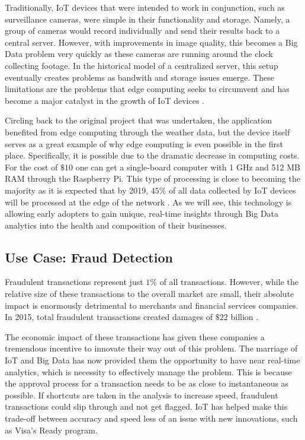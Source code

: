 \documentclass[sigconf]{acmart}
\begin{document}
Traditionally, IoT devices that were intended to work in conjunction, such as surveillance cameras, were simple in their functionality and storage. Namely, a group of cameras would record individually and send their results back to a central server. However, with improvements in image quality, this becomes a Big Data problem very quickly as these cameras are running around the clock collecting footage. In the historical model of a centralized server, this setup eventually creates problems as bandwith and storage issues emerge. These limitations are the problems that edge computing seeks to circumvent and has become a major catalyst in the growth of IoT devices \cite{edge}.   

Circling back to the original project that was undertaken, the application benefited from edge computing through the weather data, but the device itself serves as a great example of why edge computing is even possible in the first place. Specifically, it is possible due to the dramatic decrease in computing costs. For the cost of $\$10$ one can get a single-board computer with 1 GHz and 512 MB RAM through the Raspberry Pi. This type of processing is close to becoming the majority as it is expected that by 2019, $45\%$ of all data collected by IoT devices will be processed at the edge of the network \cite{msft}. As we will see, this technology is allowing early adopters to gain unique, real-time insights through Big Data analytics into the health and composition of their businesses.

\subsection{Use Case: Fraud Detection}
Fraudulent transactions represent just $1\%$ of all transactions. However, while the relative size of these transactions to the overall market are small, their absolute impact is enormously detrimental to merchants and financial services companies. In 2015, total fraudulent transactions created damages of $\$22$ billion \cite{fraud}.

The economic impact of these transactions has given these companies a tremendous incentive to innovate their way out of this problem. The marriage of IoT and Big Data has now provided them the opportunity to have near real-time analytics, which is  necessity to effectively manage the problem. This is because the approval process for a transaction needs to be as close to instantaneous as possible. If shortcuts are taken in the analysis to increase speed, fraudulent transactions could slip through and not get flagged. IoT has helped make this trade-off between accuracy and speed less of an issue with new innovations, such as Visa's Ready program. 
\end{document}
